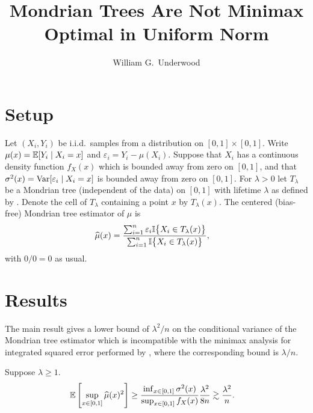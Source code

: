 \documentclass{article}
\title{Mondrian Trees Are Not Minimax Optimal in Uniform Norm}
\author{William G.\ Underwood}
\begin{document}
\maketitle







\section{Setup}

Let $(X_i, Y_i)$ be i.i.d.\ samples from a distribution
on $[0,1] \times [0,1]$.
Write $\mu(x) = \mathbb{E}[Y_i \mid X_i = x]$
and $\varepsilon_i = Y_i - \mu(X_i)$.
Suppose that $X_i$ has a continuous density function $f_X(x)$
which is bounded away from zero on $[0,1]$,
and that $\sigma^2(x) = \operatorname{Var}[\varepsilon_i \mid X_i = x]$
is bounded away from zero on $[0,1]$.
For $\lambda>0$ let $T_\lambda$ be a Mondrian tree
(independent of the data)
on $[0,1]$ with lifetime $\lambda$ as defined
by \cite{mourtada2020minimax}.
Denote the cell of $T_\lambda$ containing a point $x$
by $T_\lambda(x)$.
The centered (bias-free) Mondrian tree estimator of $\mu$ is
%
\begin{align*}
  \widehat\mu(x)
  &=
    \frac{\sum_{i=1}^n \varepsilon_i
    \mathbb{I}\big\{ X_i \in T_\lambda(x) \big\}}
    {\sum_{i=1}^n
    \mathbb{I}\big\{ X_i \in T_\lambda(x) \big\}},
\end{align*}
%
with $0/0 = 0$ as usual.





\section{Results}

The main result gives a lower bound of $\lambda^2/n$
on the conditional variance
of the Mondrian tree estimator which is incompatible with the
minimax analysis for integrated squared error performed by
\cite{mourtada2020minimax},
where the corresponding bound is $\lambda/n$.

\begin{lemma}
  Suppose $\lambda \geq 1$.
  \begin{align*}
    \mathbb{E}\left[
    \sup_{x \in [0,1]}
    \widehat\mu(x)^2
    \right]
    &\geq
      \frac{\inf_{x \in [0,1]} \sigma^2(x)}
      {\sup_{x \in [0,1]} f_X(x)}
      \frac{\lambda^2}{8n}
      \gtrsim
      \frac{\lambda^2}{n}.
  \end{align*}
\end{lemma}
\end{document}
